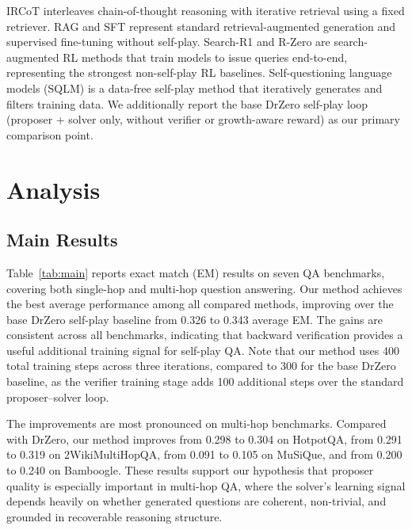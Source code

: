 \documentclass{article}
\begin{document}
IRCoT interleaves chain-of-thought reasoning with iterative retrieval using a fixed retriever.
RAG and SFT represent standard retrieval-augmented generation and supervised fine-tuning without self-play.
Search-R1 and R-Zero are search-augmented RL methods that train models to issue queries end-to-end, representing the strongest non-self-play RL baselines.
Self-questioning language models (SQLM) \cite{chen2025self} is a data-free self-play method that iteratively generates and filters training data.
We additionally report the base DrZero self-play loop (proposer + solver only, without verifier or growth-aware reward) as our primary comparison point.


\section{Analysis}

\subsection{Main Results}

Table~\ref{tab:main} reports exact match (EM) results on seven QA benchmarks,
covering both single-hop and multi-hop question answering. Our method achieves
the best average performance among all compared methods, improving over the
base DrZero self-play baseline from 0.326 to 0.343 average EM. The gains are
consistent across all benchmarks, indicating that backward verification provides
a useful additional training signal for self-play QA.
Note that our method uses 400 total training steps across three iterations, compared to 300 for the base DrZero baseline, as the verifier training stage adds 100 additional steps over the standard proposer--solver loop.

The improvements are most pronounced on multi-hop benchmarks. Compared with
DrZero, our method improves from 0.298 to 0.304 on HotpotQA, from 0.291 to
0.319 on 2WikiMultiHopQA, from 0.091 to 0.105 on MuSiQue, and from 0.200 to
0.240 on Bamboogle. These results support our hypothesis that proposer quality
is especially important in multi-hop QA, where the solver's learning signal
depends heavily on whether generated questions are coherent, non-trivial, and
grounded in recoverable reasoning structure.
\end{document}
